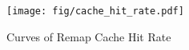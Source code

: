 \begin{figure}[t]
  \centering
  \texttt{[image: fig/cache\_hit\_rate.pdf]}
  \caption{Curves of Remap Cache Hit Rate}
  \label{fig:remap_cache_hit_rate}
\end{figure}